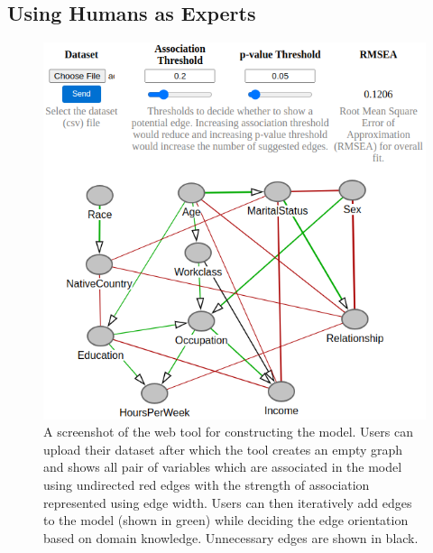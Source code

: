 \documentclass{uai2025} %
\begin{document}
\subsection{Using Humans as Experts}


\begin{figure}[t!]
	\centering
	\includegraphics[scale=0.4]{../code/plots/web_tool_full_new.png}
	\caption{A screenshot of the web tool for constructing the model. Users
		can upload their dataset after which the tool creates an empty
		graph and shows all pair of variables which are associated in
		the model using undirected red edges with the strength of
		association represented using edge width. Users can then
		iteratively add edges to the model (shown in green) while
		deciding the edge orientation based on domain knowledge.
		Unnecessary edges are shown in black.}
	\label{fig:web}
\end{figure}
\end{document}
